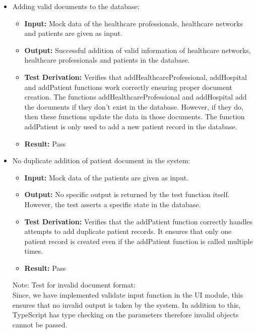 \documentclass[12pt, titlepage]{article}
\begin{document}
  \begin{itemize}
    \item Adding valid documents to the database:
      \begin{itemize}
        \item \textbf{Input:} Mock data of the healthcare professionals, healthcare networks and patients are given as input.  
        \item \textbf{Output:} Successful addition of valid information of healthcare networks, healthcare professionals and patients in the database. 
        \item \textbf{Test Derivation:} Verifies that addHealthcareProfessional, addHospital and addPatient functions work correctly ensuring proper document creation. The functions addHealthcareProfessional and addHospital add the documents if they don't exist in the database. However, if they do, then these functions update the data in those documents. The function addPatient is only used to add a new patient record in the database.
        \item \textbf{Result:} Pass 
      \end{itemize}

    \item No duplicate addition of patient document in the system:
      \begin{itemize}
        \item \textbf{Input:} Mock data of the patients are given as input.  
        \item \textbf{Output:} No specific output is returned by the test function itself. However, the test asserts a specific state in the database. 
        \item \textbf{Test Derivation:} Verifies that the addPatient function correctly handles attempts to add duplicate patient records. It ensures that only one patient record is created even if the addPatient function is called multiple times.
        \item \textbf{Result:} Pass
      \end{itemize}

      Note: Test for invalid document format: \\
      Since, we have implemented validate input function in the UI module, this ensures that no invalid output is taken by the system. In addition to this, TypeScript has type checking on the parameters therefore invalid objects cannot be passed.


\end{itemize}
\end{document}
